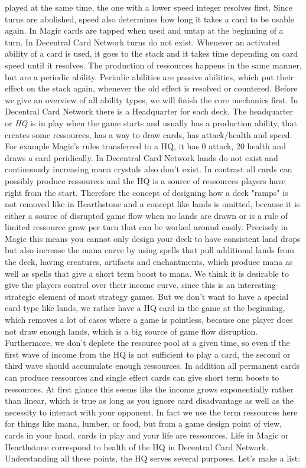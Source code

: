 \documentclass{article}
\begin{document}
played at the same time, the one with a lower speed integer resolves first. Since turns are abolished, speed also determines how long it takes a card to be usable again. In Magic cards are tapped when used and untap at the beginning of a turn. In Decentral Card Network turns do not exist. Whenever an activated ability of a card is used, it goes to the stack and it takes time depending on card speed until it resolves. The production of ressources happens in the same manner, but are a periodic ability. Periodic abilities are passive abilities, which put their effect on the stack again, whenever the old effect is resolved or countered. Before we give an overview of all ability types, we will finish the core mechanics first. In Decentral Card Network there is a Headquarter for each deck. The headquarter or \textit{HQ} is in play when the game starts and usually has a production ability, that creates some ressources, has a way to draw cards, has attack/health and speed. For example Magic's rules transferred to a HQ, it has 0 attack, 20 health and draws a card peridically. In Decentral Card Network lands do not exist and continuously increasing mana crystals also don't exist. In contrast all cards can possibly produce ressources and the HQ is a source of ressources players have right from the start. Therefore the concept of designing how a deck "ramps" is not removed like in Hearthstone and a concept like lands is omitted, because it is either a source of disrupted game flow when no lands are drawn or is a rule of limited ressource grow per turn that can be worked around easily. Precisely in Magic this means you cannot only design your deck to have consistent land drops but also increase the mana curve by using spells that pull additional lands from the deck, having creatures, artifacts and enchantments, which produce mana as well as spells that give a short term boost to mana. We think it is desirable to give the players control over their income curve, since this is an interesting strategic element of most strategy games. But we don't want to have a special card type like lands, we rather have a HQ card in the game at the beginning, which removes a lot of cases where a game is pointless, because one player does not draw enough lands, which is a big source of game flow disruption. Furthermore, we don't deplete the resource pool at a given time, so even if the first wave of income from the HQ is not sufficient to play a card, the second or third wave should accumulate enough ressources. In addition all permanent cards can produce ressources and single effect cards can give short term boosts to ressources. At first glance this seems like the income grows exponentially rather than linear, which is true as long as you ignore card disadvantage as well as the necessity to interact with your opponent. In fact we use the term ressources here for things like mana, lumber, or food, but from a game design point of view, cards in your hand, cards in play and your life are ressources. Life in Magic or Hearthstone correspond to health of the HQ in Decentral Card Network. Understanding all these points, the HQ serves several purposes. Let's make a list:
\end{document}
